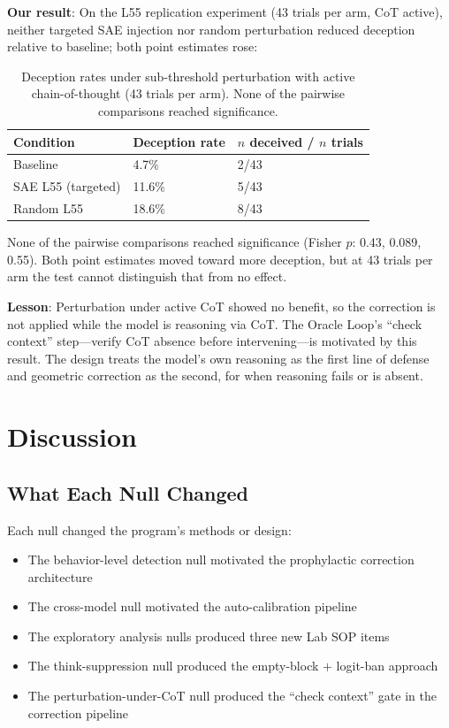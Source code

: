 \documentclass[11pt,letterpaper]{article}
\begin{document}
\textbf{Our result}: On the L55 replication experiment (43 trials per arm, CoT active), neither
targeted SAE injection nor random perturbation reduced deception relative to baseline; both point
estimates rose:

\begin{table}[H]
  \centering
  \caption{Deception rates under sub-threshold perturbation with active chain-of-thought (43 trials
    per arm). None of the pairwise comparisons reached significance.}
  \label{tab:iatrogenic}
  \begin{tabular}{@{}lll@{}}
    \toprule
    \textbf{Condition} & \textbf{Deception rate} & \textbf{$n$ deceived / $n$ trials} \\
    \midrule
    Baseline            & 4.7\%  & 2/43 \\
    SAE L55 (targeted)  & 11.6\% & 5/43 \\
    Random L55          & 18.6\% & 8/43 \\
    \bottomrule
  \end{tabular}
\end{table}

None of the pairwise comparisons reached significance (Fisher $p$: 0.43, 0.089, 0.55). Both
point estimates moved toward more deception, but at 43 trials per arm the test cannot distinguish
that from no effect.

\textbf{Lesson}: Perturbation under active CoT showed no benefit, so the correction is not applied
while the model is reasoning via CoT. The Oracle Loop's ``check context'' step---verify CoT absence
before intervening---is motivated by this result. The design treats the model's own reasoning as
the first line of defense and geometric correction as the second, for when reasoning fails or is
absent.

\section{Discussion}\label{sec:discussion}

\subsection{What Each Null Changed}

Each null changed the program's methods or design:
\begin{itemize}
  \item The behavior-level detection null motivated the prophylactic correction architecture
  \item The cross-model null motivated the auto-calibration pipeline
  \item The exploratory analysis nulls produced three new Lab SOP items
  \item The think-suppression null produced the empty-block $+$ logit-ban approach
  \item The perturbation-under-CoT null produced the ``check context'' gate in the correction pipeline
\end{itemize}
\end{document}
